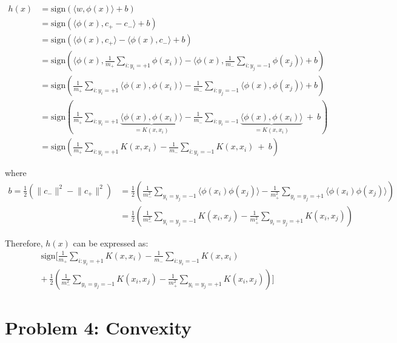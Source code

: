 \documentclass[twoside,11pt]{homework}
\DeclarePairedDelimiter{\2norm}{\lVert}{\rVert^2_2}
\newcommand{\1}[1]{\mathds{1}\left[#1\right]}
\begin{document}
\begin{enumerate}[\bf (i)]
\begin{enumerate}[(a)]
\begin{align*}
h(x) & = \text{sign}\left(\langle w, \phi(x) \rangle  +  b \right) \\
& = \text{sign}\left(\langle \phi(x), c_{+} - c_{-} \rangle  +  b \right) \\ 
& = \text{sign}\left(\langle \phi(x), c_{+} \rangle - \langle \phi(x), c_{-} \rangle +  b \right) \\
& = \text{sign}\left(\langle \phi(x), \frac{1}{m_+}\sum_{i:y_i = +1} \phi(x_i) \rangle - \langle \phi(x), \frac{1}{m_-}\sum_{i:y_j = -1} \phi(x_j) \rangle +  b \right) \\
& = \text{sign}\left( \frac{1}{m_+}\sum_{i:y_i = +1} \langle \phi(x), \phi(x_i) \rangle -  \frac{1}{m_-}\sum_{i:y_j = -1} \langle \phi(x), \phi(x_j) \rangle +  b \right) \\ 
& = \text{sign}\left( \frac{1}{m_+}\sum_{i:y_i = +1} \underbrace{\langle \phi(x), \phi(x_i) \rangle}_{= K(x, x_i)} -  \frac{1}{m_-}\sum_{i:y_i = -1} \underbrace{\langle \phi(x), \phi(x_i) \rangle}_{= K(x, x_i)} \ + \  b \right) \\
& = \text{sign}\left( \frac{1}{m_+}\sum_{i:y_i = +1} K(x, x_i) -  \frac{1}{m_-}\sum_{i:y_i = -1} K(x, x_i) \ + \  b \right)
\end{align*}

where \begin{align*} 
b =\frac{1}{2}\left(\lVert c_{-} \rVert^2  - \lVert c_{+}\rVert^2\right) & = \frac{1}{2}\left(\frac{1}{m_{-}^2} \sum_{y_i = y_j = -1} \langle \phi(x_i)\phi(x_j) \rangle - \frac{1}{m_{+}^2} \sum_{y_i = y_j = +1} \langle \phi(x_i)\phi(x_j)\rangle \right) \\
& = \frac{1}{2}\left(\frac{1}{m_{-}^2} \sum_{y_i = y_j = -1} K(x_i, x_j) - \frac{1}{m_{+}^2} \sum_{y_i = y_j = +1} K(x_i, x_j)\right)
\end{align*}

Therefore, $h(x)$ can be expressed as:
\begin{multline*}
\text{sign} \Bigg[ \frac{1}{m_+}\sum_{i:y_i = +1} K(x, x_i) -  \frac{1}{m_-}\sum_{i:y_i = -1} K(x, x_i) \\
+ \ \frac{1}{2}\left(\frac{1}{m_{-}^2} \sum_{y_i = y_j = -1} K(x_i, x_j) - \frac{1}{m_{+}^2} \sum_{y_i = y_j = +1} K(x_i, x_j) \right) \Bigg]
\end{multline*}
\end{enumerate}

\end{enumerate}


\section*{Problem 4: Convexity}
\end{document}
